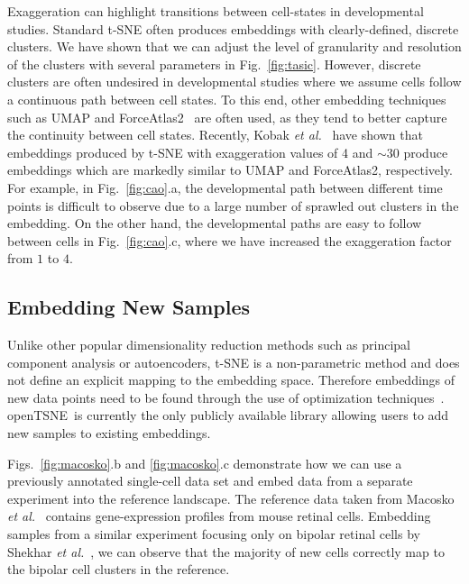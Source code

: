\documentclass[twocolumn]{bmcart}
\newcommand{\opentsne}{\textsf{openTSNE}}
\begin{document}
Exaggeration can highlight transitions between cell-states in
developmental studies. Standard t-SNE often produces embeddings with
clearly-defined, discrete clusters. We have shown that we can adjust the level
of granularity and resolution of the clusters with several parameters in Fig.~\ref{fig:tasic}. However,
discrete clusters are often undesired in developmental studies where we assume
cells follow a continuous path between cell states. To this end, other
embedding techniques such as UMAP and ForceAtlas2~\cite{jacomy2014forceatlas2}
are often used, as they tend to better capture the continuity between cell
states. Recently, Kobak \textit{et al.}~\cite{TODO} have shown that embeddings
produced by t-SNE with exaggeration values of 4 and $\sim30$ produce embeddings
which are markedly similar to UMAP and ForceAtlas2, respectively. For example,
in Fig.~\ref{fig:cao}.a, the developmental path between different time points
is difficult to observe due to a large number of sprawled out clusters in the
embedding. On the other hand, the developmental paths are easy to follow
between cells in Fig.~\ref{fig:cao}.c, where we have increased the exaggeration
factor from $1$ to $4$.

\subsection*{Embedding New Samples}

Unlike other popular dimensionality reduction methods such as principal
component analysis or autoencoders, t-SNE is a non-parametric method and does
not define an explicit mapping to the embedding space. Therefore embeddings of
new data points need to be found through the use of optimization
techniques~\cite{policar2019embedding}. \opentsne\ is currently the only
publicly available library allowing users to add new samples to existing
embeddings.

Figs.~\ref{fig:macosko}.b and \ref{fig:macosko}.c demonstrate how we can use a
previously annotated single-cell data set and embed data from a separate
experiment into the reference landscape. The reference data taken from Macosko
\textit{et al.}~\cite{macosko2015highly} contains gene-expression profiles from
mouse retinal cells. Embedding samples from a similar experiment focusing only
on bipolar retinal cells by Shekhar \textit{et
al.}~\cite{shekhar2016comprehensive}, we can observe that the majority of new
cells correctly map to the bipolar cell clusters in the reference.
\end{document}
